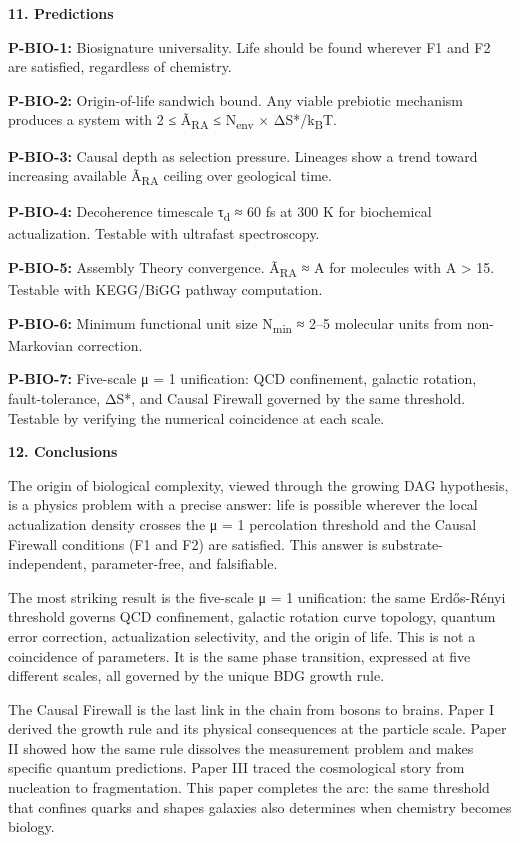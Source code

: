 \documentclass[12pt,a4paper]{article}
\begin{document}
\textbf{11. Predictions}

\textbf{P-BIO-1:} Biosignature universality. Life should be found
wherever F1 and F2 are satisfied, regardless of chemistry.

\textbf{P-BIO-2:} Origin-of-life sandwich bound. Any viable prebiotic
mechanism produces a system with 2 ≤ Ã\textsubscript{RA} ≤
N\textsubscript{env} × ΔS*/k\textsubscript{B}T.

\textbf{P-BIO-3:} Causal depth as selection pressure. Lineages show a
trend toward increasing available Ã\textsubscript{RA} ceiling over
geological time.

\textbf{P-BIO-4:} Decoherence timescale τ\textsubscript{d} ≈ 60 fs at
300 K for biochemical actualization. Testable with ultrafast
spectroscopy.

\textbf{P-BIO-5:} Assembly Theory convergence. Ã\textsubscript{RA} ≈ A
for molecules with A \textgreater{} 15. Testable with KEGG/BiGG pathway
computation.

\textbf{P-BIO-6:} Minimum functional unit size N\textsubscript{min} ≈
2--5 molecular units from non-Markovian correction.

\textbf{P-BIO-7:} Five-scale μ = 1 unification: QCD confinement,
galactic rotation, fault-tolerance, ΔS*, and Causal Firewall governed by
the same threshold. Testable by verifying the numerical coincidence at
each scale.

\textbf{12. Conclusions}

The origin of biological complexity, viewed through the growing DAG
hypothesis, is a physics problem with a precise answer: life is possible
wherever the local actualization density crosses the μ = 1 percolation
threshold and the Causal Firewall conditions (F1 and F2) are satisfied.
This answer is substrate-independent, parameter-free, and falsifiable.

The most striking result is the five-scale μ = 1 unification: the same
Erdős-Rényi threshold governs QCD confinement, galactic rotation curve
topology, quantum error correction, actualization selectivity, and the
origin of life. This is not a coincidence of parameters. It is the same
phase transition, expressed at five different scales, all governed by
the unique BDG growth rule.

The Causal Firewall is the last link in the chain from bosons to brains.
Paper I derived the growth rule and its physical consequences at the
particle scale. Paper II showed how the same rule dissolves the
measurement problem and makes specific quantum predictions. Paper III
traced the cosmological story from nucleation to fragmentation. This
paper completes the arc: the same threshold that confines quarks and
shapes galaxies also determines when chemistry becomes biology.
\end{document}
